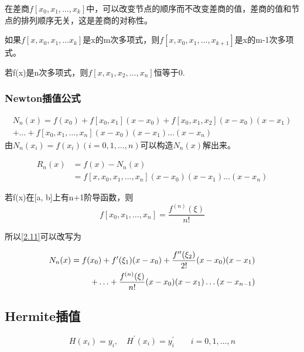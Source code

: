 \documentclass[12pt]{article}
\numberwithin{equation}{section}
\begin{document}
	在差商$f[x_0, x_1, \ldots , x_k]$中，可以改变节点的顺序而不改变差商的值，差商的值和节点的排列顺序无关，这是差商的对称性。

	如果$f[x, x_0, x_1, \ldots x_k]$是x的m次多项式，则$f[x, x_0, x_1, \ldots , x_{k+1}]$是x的m-1次多项式。

	若f(x)是n次多项式，则$f[x, x_1, x_2, \ldots , x_n]$恒等于0.

	\subsubsection{Newton插值公式}

	\begin{equation} \tag{2.11} \label{2.11}
		\begin{aligned}
			N_n(x) = f(x_0) + f[x_0, x_1](x - x_0) + f[x_0, x_1, x_2](x - x_0)(x - x_1) \\  
			+\ldots + f[x_0, x_1, \ldots , x_n](x - x_0)(x - x_1)\ldots (x - x_n)
		\end{aligned}
	\end{equation}
	由$N_n(x_i) = f(x_i) (i = 0, 1, \ldots , n)$可以构造$N_n(x)$解出来。
	
	\begin{equation} \tag{2.12} \label{2.12}
		\begin{aligned}
			R_n(x) &= f(x) - N_n(x) \\
			&= f[x, x_0, x_1, \ldots , x_n](x - x_0)(x - x_1) \ldots (x - x_n) 
		\end{aligned}
	\end{equation}

	若f(x)在[a, b]上有n+1阶导函数，则
	$$
	f[x_0, x_1, \ldots , x_n] = \frac{f^{(n)}(\xi)}{n!}
	$$

	所以\eqref{2.11}可以改写为

	\begin{equation}
		\begin{aligned}
			\notag
			N_n(x) = f(x_0) + f^\prime (\xi_1)(x - x_0) + \frac{f^{\prime \prime}(\xi_2)}{2!}(x - x_0)(x - x_1) \\
			+ \ldots + \frac{f^{(n)}(\xi)}{n!}(x - x_0)(x - x_1)\ldots (x - x_{n-1})
		\end{aligned}
	\end{equation}

	\subsection{Hermite插值}
	$$
	H(x_i) = y_i, \quad H^\prime (x_i) = y^\prime_i \quad \quad i = 0, 1, \ldots , n
	$$
\end{document}
